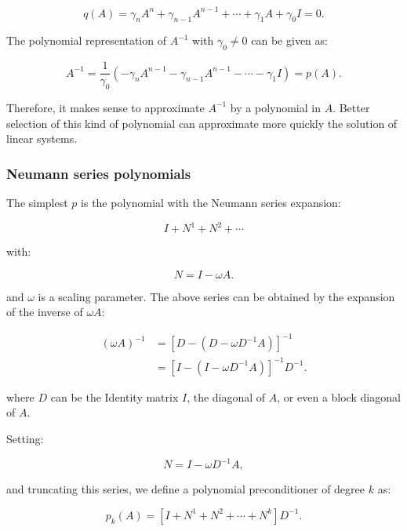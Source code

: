 \begin{equation}
q(A) = \gamma_nA^n+\gamma_{n-1}A^{n-1}+\cdots+\gamma_1A+\gamma_0I = 0.
\end{equation}

The polynomial representation of $A^{-1}$ with $\gamma_0 \neq 0$ can be given as:

\begin{equation}
A^{-1}=\frac{1}{\gamma_0}(-\gamma_nA^{n-1}-\gamma_{n-1}A^{n-1}-\cdots-\gamma_1I)=p(A).
\end{equation}

Therefore, it makes sense to approximate $A^{-1}$ by a polynomial in $A$.  Better selection of this kind of polynomial can approximate more quickly the solution of linear systems.

\subsubsection{Neumann series polynomials}

The simplest $p$ is the polynomial with the Neumann series expansion:

\begin{equation}
I+N^1+N^2+\cdots
\end{equation}

with:

\begin{equation}
N=I-\omega A.
\end{equation}

and $\omega$ is a scaling parameter. The above series can be obtained by the expansion of the inverse of $\omega A$:

\begin{equation}
\begin{aligned}
(\omega A)^{-1} &= [D-(D- \omega D^{-1}A)]^{-1} \\ &= [I-(I- \omega D^{-1}A)]^{-1}D^{-1}. 
\end{aligned}
\end{equation}

where $D$ can be the Identity matrix $I$, the diagonal of $A$, or even a block diagonal of $A$.

Setting:

\begin{equation}
N=I- \omega D^{-1}A,
\end{equation}

and truncating this series, we define a polynomial preconditioner of degree $k$ as:

\begin{equation}
p_{k}(A) = [I+N^1+N^2+\cdots+N^k]D^{-1}.
\end{equation}


